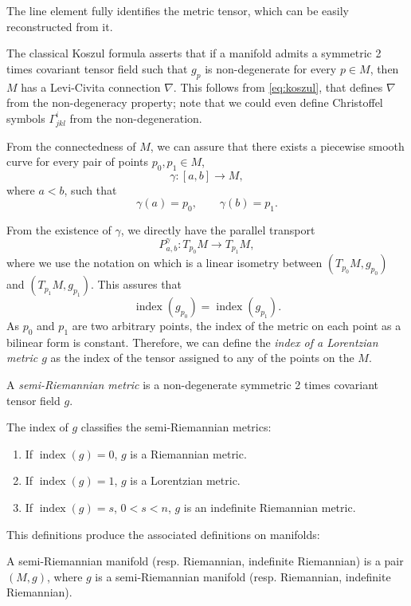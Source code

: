 The line element fully identifies the metric tensor, which can be easily reconstructed from it.

The classical Koszul formula asserts that if a manifold admits a symmetric 2 times covariant tensor field such that $g_p$ is non-degenerate for every $p \in M$, then $M$ has a Levi-Civita connection $\nabla$.  This follows from \autoref{eq:koszul}, that defines $\nabla$ from the non-degeneracy property; note that we could even define Christoffel symbols $\Gamma^i_{jkl}$ from the non-degeneration.

From the connectedness of $M$, we can assure that there exists a piecewise smooth curve for every pair of points $p_0, p_1 \in M$,
\[
\gamma \colon [a,b] \to M,
\]
where $a < b$, such that
\[
\gamma(a) = p_0, \qquad \gamma(b) = p_1.
\]

From the existence of $\gamma$, we directly have the parallel transport
\[
P^\gamma_{a,b} \colon T_{p_0}M \to T_{p_1}M,
\]
where we use the notation on \cite[Prop 3.19]{oneill83} which is a linear isometry between $(T_{p_0}M, g_{p_0})$ and $(T_{p_1}M, g_{p_1})$. This assures that
\[
\operatorname{index}(g_{p_0}) = \operatorname{index}(g_{p_1}).
\]
As $p_0$ and $p_1$ are two arbitrary points, the index of the metric on each point as a bilinear form is constant. Therefore, we can define the \emph{index of a Lorentzian metric $g$} as the index of the tensor assigned to any of the points on the $M$.

\begin{definition}
	A \emph{semi-Riemannian metric} is a non-degenerate symmetric 2 times covariant tensor field $g$.
\end{definition}

The index of $g$ classifies the semi-Riemannian metrics:
\begin{enumerate}
	\item If $\operatorname{index}(g) = 0$, $g$ is a Riemannian metric.
	\item If $\operatorname{index}(g) = 1$, $g$ is a Lorentzian metric.
	\item If $\operatorname{index}(g) = s$, $0 < s < n$, $g$ is an indefinite Riemannian metric.
\end{enumerate}

This definitions produce the associated definitions on manifolds:
\begin{definition}
	A semi-Riemannian manifold (resp. Riemannian, indefinite Riemannian) is a pair $(M,g)$, where $g$ is a semi-Riemannian manifold (resp. Riemannian, indefinite Riemannian).
\end{definition}

